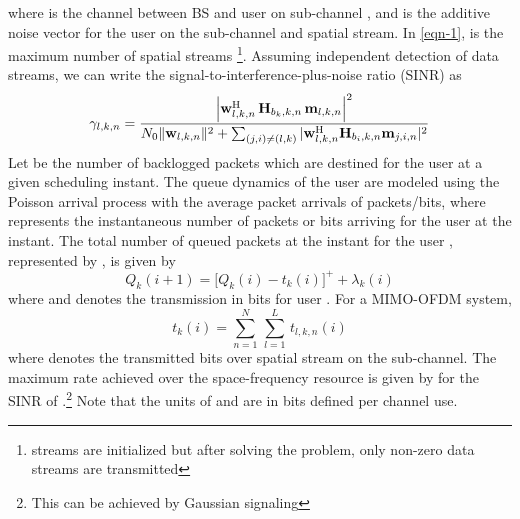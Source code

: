 where  is the channel between \ac{BS}  and  user  on sub-channel , and   is the additive noise vector for the user  on the  sub-channel and  spatial stream. In \eqref{eqn-1},  is the maximum number of spatial streams \footnote{ streams are initialized but after solving the problem, only  non-zero data streams are transmitted}. Assuming independent detection of data streams, we can write the signal-to-interference-plus-noise ratio (SINR) as
\begin{equation}\label{eq:SINR}
\gamma_{l,k,n} = \dfrac{\left |\mvec{w}{l,k,n}^\herm \, \mvec{H}{b_k,k,n} \, \mvec{m}{l,k,n} \right |^2}{N_0\|\mvec{w}{l,k,n}\|^2 + \sum_{(j,i) \neq (l,k)} |\mvec{w}{l,k,n}^\herm \mvec{H}{b_i,k,n} \mvec{m}{j,i,n} |^2}
\end{equation}
Let  be the number of backlogged packets which are destined for the user  at a given scheduling instant. The queue dynamics of the user  are modeled using the Poisson arrival process with the average packet arrivals of  packets/bits, where  represents the instantaneous number of packets or bits arriving for the user  at the  instant. The total number of queued packets at the  instant for the user , represented by , is given by
\begin{equation}
Q_k(i+1) = \Big [ Q_k(i) - t_k(i) \Big ]^+ + \lambda_k(i)
\label{eqn-2a}
\end{equation}
where  and  denotes the transmission in bits for user . For a \ac{MIMO}-\ac{OFDM} system,
\begin{equation}
t_k(i) = \sum_{n = 1}^N \, \sum_{l = 1}^L \, t_{l,k,n}(i)
\end{equation}
where  denotes the transmitted bits over  spatial stream on the  sub-channel. The maximum rate achieved over the  space-frequency resource is given by  for the \ac{SINR} of .\footnote{This can be achieved by Gaussian signaling} Note that the units of  and  are in bits defined per channel use. 